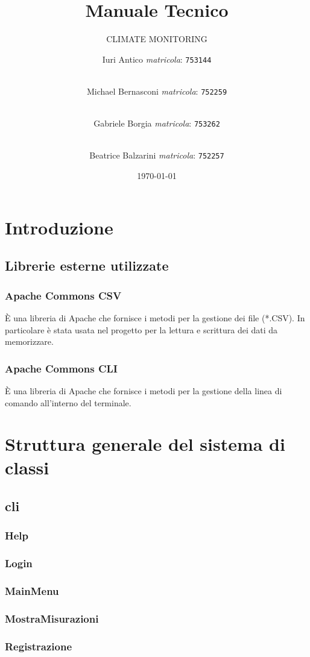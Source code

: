 \documentclass[a4paper, 12pt]{scrreprt}
\title {Manuale Tecnico}
\subtitle{CLIMATE MONITORING}
\author{
	Iuri Antico \textit{matricola}:
	\texttt{753144}
	\and \\
	Michael Bernasconi \textit{matricola}:
	\texttt{752259}
	\and \\
	Gabriele Borgia \textit{matricola}:
	\texttt{753262}
	\and \\
	Beatrice Balzarini \textit{matricola}:
	\texttt{752257}
}
\date{\today}
\begin{document}
	\maketitle

	\tableofcontents
	\listoffigures
	\listoftables

	\chapter{Introduzione}
		\section{Librerie esterne utilizzate}
			\subsection{Apache Commons CSV}
			\`E una libreria di Apache che fornisce i metodi per la gestione dei file (*.CSV). In particolare \`e stata usata nel progetto per la lettura e scrittura dei dati da memorizzare.
			\subsection{Apache Commons CLI}
			\`E una libreria di Apache che fornisce i metodi per la gestione della linea di comando all'interno del terminale.

	\chapter{Struttura generale del sistema di classi}
		\section{cli}
			\subsection{Help}
			\subsection{Login}
			\subsection{MainMenu}
			\subsection{MostraMisurazioni}
			\subsection{Registrazione}
\end{document}
